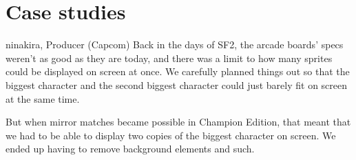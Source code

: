 \chapter{Case studies}
\begin{q}{ninakira, Producer (Capcom)}
Back in the days of SF2, the arcade boards' specs weren't as good as they are today, and there was a limit to how many sprites could be displayed on screen at once. We carefully planned things out so that the biggest character and the second biggest character could just barely fit on screen at the same time. 

But when mirror matches became possible in Champion Edition, that meant that we had to be able to display two copies of the biggest character on screen. We ended up having to remove background elements and such.
\end{q}